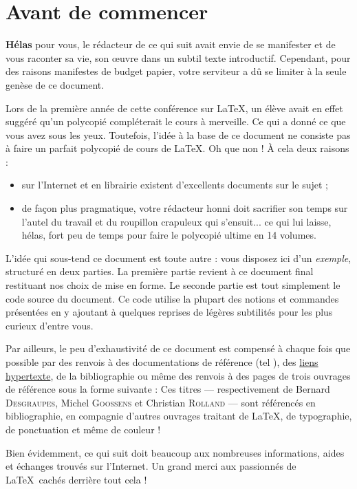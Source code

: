 
\chapter{Avant de commencer}
\mtcaddchapter

{\bf \LARGE Hélas} pour vous, le rédacteur de ce qui suit avait envie de se manifester et de vous raconter \og sa vie, son \oe uvre \fg{} dans un subtil texte introductif. Cependant, pour des raisons manifestes de budget papier, votre serviteur a dû se limiter à la seule genèse de ce document. 

Lors de la première année de cette \og conférence \fg{} sur \LaTeX, un élève avait en effet suggéré qu'un polycopié compléterait le cours à merveille. Ce qui a donné ce que vous avez sous les yeux. Toutefois, l'idée à la base de ce document ne consiste pas à faire un parfait polycopié de cours de \LaTeX. Oh que non ! \`{A} cela deux raisons :

\begin{itemize}
\item sur l'Internet et en librairie existent d'excellents documents sur le sujet ; 
\item de façon plus pragmatique, votre rédacteur honni doit sacrifier son temps sur l'autel du travail et du roupillon crapuleux qui s'ensuit... ce qui lui laisse, hélas, fort peu de temps pour faire le polycopié ultime en 14 volumes. \\
\end{itemize}

L'idée qui sous-tend ce document est toute autre : vous disposez ici d'un \emph{exemple}, structuré en deux parties. La première partie revient à ce document final restituant nos choix de mise en forme. Le seconde partie est tout simplement le code source du document. Ce code utilise la plupart des notions et commandes présentées en y ajoutant à quelques reprises de légères subtilités pour les plus curieux d'entre vous. 

Par ailleurs, le peu d'exhaustivité de ce document est compensé à chaque fois que possible par des renvois à des documentations de référence (tel ), des \href{http://fr.wikipedia.org/wiki/Hyperlien}{liens hypertexte}, de la bibliographie ou même des renvois à des pages de trois ouvrages de référence sous la forme suivante :
Ces titres --- respectivement de Bernard \textsc{Desgraupes}\cite{desg}, Michel \textsc{Goossens}\cite{gomi} et Christian \textsc{Rolland}\cite{roll} --- sont référencés en bibliographie, en compagnie d'autres ouvrages traitant de \LaTeX, de typographie, de ponctuation \cite{coli} et même de couleur \cite{past} !

Bien évidemment, ce qui suit doit beaucoup aux nombreuses informations, aides et échanges trouvés sur l'Internet. Un grand merci aux passionnés de \LaTeX\ cachés derrière tout cela !